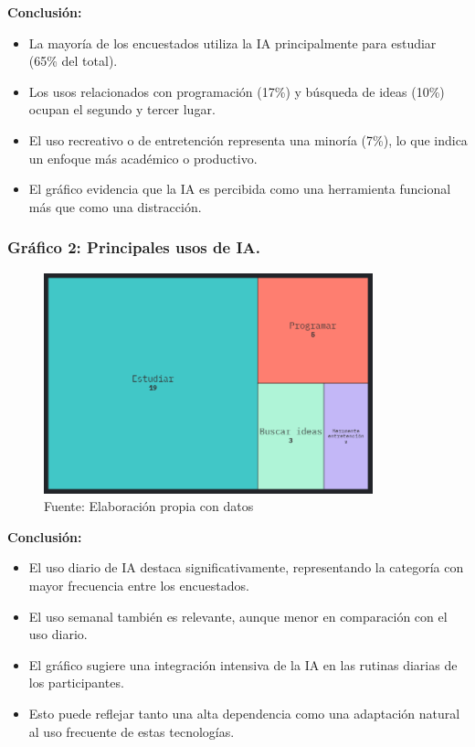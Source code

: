 \documentclass[12pt, a4paper]{article}
\begin{document}
\textbf{Conclusión:}
\begin{itemize}
    \item La mayoría de los encuestados utiliza la IA principalmente para estudiar (65\% del total).
    \item Los usos relacionados con programación (17\%) y búsqueda de ideas (10\%) ocupan el segundo y tercer lugar.
    \item El uso recreativo o de entretención representa una minoría (7\%), lo que indica un enfoque más académico o productivo.
    \item El gráfico evidencia que la IA es percibida como una herramienta funcional más que como una distracción.
\end{itemize}

\subsubsection*{Gráfico 2: Principales usos de IA.}
\begin{figure}[H]
    \centering
    \includegraphics[width=0.85\textwidth]{Graficos/Treemap_Uso_IA_FC.png}
    \caption[2]{Fuente: Elaboración propia con datos}
\end{figure}

\textbf{Conclusión:}
\begin{itemize}
    \item El uso diario de IA destaca significativamente, representando la categoría con mayor frecuencia entre los encuestados.
    \item El uso semanal también es relevante, aunque menor en comparación con el uso diario.
    \item El gráfico sugiere una integración intensiva de la IA en las rutinas diarias de los participantes.
    \item Esto puede reflejar tanto una alta dependencia como una adaptación natural al uso frecuente de estas tecnologías.
\end{itemize}
\end{document}
